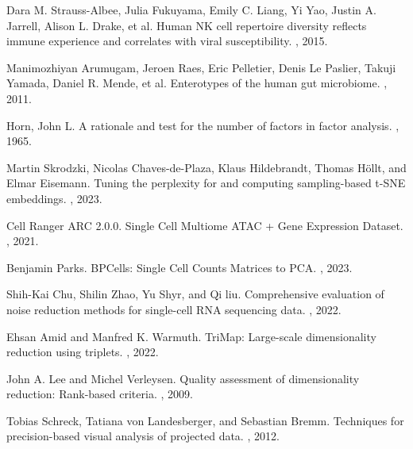 \documentclass{article}
\begin{document}
\begin{thebibliography}{10}
Dara M. Strauss-Albee, Julia Fukuyama, Emily C. Liang, Yi Yao, Justin A. Jarrell, Alison L. Drake, et al.
\newblock Human NK cell repertoire diversity reflects immune experience and correlates with viral susceptibility.
, 2015.

Manimozhiyan Arumugam, Jeroen Raes, Eric Pelletier, Denis Le Paslier, Takuji Yamada, Daniel R. Mende, et al.
\newblock Enterotypes of the human gut microbiome.
, 2011.

Horn, John L.
\newblock A rationale and test for the number of factors in factor analysis.
, 1965.

Martin Skrodzki, Nicolas Chaves-de-Plaza, Klaus Hildebrandt, Thomas H\"ollt, and Elmar Eisemann.
\newblock Tuning the perplexity for and computing sampling-based t-SNE embeddings.
, 2023.

Cell Ranger ARC 2.0.0.
\newblock Single Cell Multiome ATAC + Gene Expression Dataset.
, 2021.

Benjamin Parks.
\newblock BPCells: Single Cell Counts Matrices to PCA.
, 2023.

Shih-Kai Chu, Shilin Zhao, Yu Shyr, and Qi liu.
\newblock Comprehensive evaluation of noise reduction methods for single-cell RNA sequencing data.
, 2022.

Ehsan Amid and Manfred K. Warmuth. 
\newblock TriMap: Large-scale dimensionality reduction using triplets. 
, 2022.

John A. Lee and Michel Verleysen.
\newblock Quality assessment of dimensionality reduction: Rank-based criteria.
, 2009.

Tobias Schreck, Tatiana von Landesberger, and Sebastian Bremm.
\newblock Techniques for precision-based visual analysis of projected data.
, 2012.

\end{thebibliography}
\end{document}
